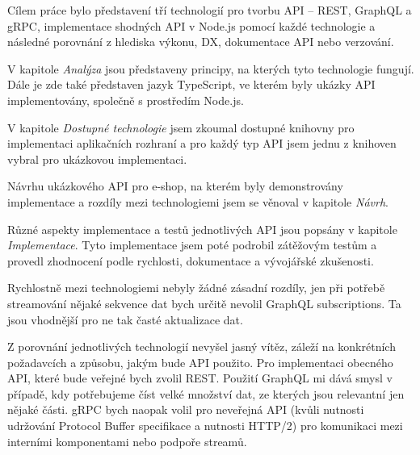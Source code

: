 \documentclass[thesis=M,czech]{FITthesis}[2019/12/23]
\begin{document}
\begin{conclusion}
Cílem práce bylo představení tří technologií pro tvorbu API -- REST, GraphQL a gRPC, implementace shodných API v Node.js pomocí každé technologie a následné porovnání z hlediska výkonu, DX, dokumentace API nebo verzování.

V kapitole \textit{Analýza} jsou představeny principy, na kterých tyto technologie fungují. Dále je zde také představen jazyk TypeScript, ve kterém byly ukázky API implementovány, společně s prostředím Node.js.

V kapitole \textit{Dostupné technologie} jsem zkoumal dostupné knihovny pro implementaci aplikačních rozhraní a pro každý typ API jsem jednu z knihoven vybral pro ukázkovou implementaci.

Návrhu ukázkového API pro e-shop, na kterém byly demonstrovány implementace a rozdíly mezi technologiemi jsem se věnoval v kapitole \textit{Návrh}.

Různé aspekty implementace a testů jednotlivých API jsou popsány v kapitole \textit{Implementace}. Tyto implementace jsem poté podrobil zátěžovým testům a provedl zhodnocení podle rychlosti, dokumentace a vývojářské zkušenosti.

Rychlostně mezi technologiemi nebyly žádné zásadní rozdíly, jen při potřebě streamování nějaké sekvence dat bych určitě nevolil GraphQL subscriptions. Ta jsou vhodnější pro ne tak časté aktualizace dat.

Z porovnání jednotlivých technologií nevyšel jasný vítěz, záleží na konkrétních požadavcích a způsobu, jakým bude API použito. Pro implementaci obecného API, které bude veřejné bych zvolil REST. Použití GraphQL mi dává smysl v případě, kdy potřebujeme číst velké množství dat, ze kterých jsou relevantní jen nějaké části. gRPC bych naopak volil pro neveřejná API (kvůli nutnosti udržování Protocol Buffer specifikace  a nutnosti HTTP/2) pro komunikaci mezi interními komponentami nebo podpoře streamů.

\end{conclusion}




\appendix
\end{document}
